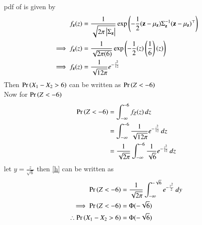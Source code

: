 \documentclass[journal,12pt,twocolumn]{IEEEtran}
\begin{document}
pdf of  is given by
\begin{align}
    f_\mathbf{z}(z)&=\frac{1}{\sqrt{2\pi\begin{vmatrix}\Sigma{_\mathbf{z}}\end{vmatrix}}}\exp{\ensuremath{\left(-\frac{1}{2}(\mathbf{z}-\mu_{\mathbf{z}})\Sigma^{-1}_{\mathbf{z}}(\mathbf{z}-\mu_{\mathbf{z}})^{\top}\right)}}\\
    \implies f_\mathbf{z}(z)&=\frac{1}{\sqrt{2\pi(6)}}\exp{\ensuremath{\left(-\frac{1}{2}(z)\left(\frac{1}{6}\right)(z)\right)}}\\
    \implies f_\mathbf{z}(z)&=\frac{1}{\sqrt{12\pi}}e^{-\frac{{z}^2}{12}}
\end{align}
Then $\Pr\left(X_1-X_2>6\right)$ can be written as $\Pr\left(Z<-6\right)$\\

Now for $\Pr\left(Z<-6\right)$
\begin{align}
    \Pr\left(Z<-6\right)&=\int_{-\infty}^{-6}f_Z(z)\,dz\\
             &=\int_{-\infty}^{-6}\frac{1}{ \sqrt{12\pi}}e^{-\frac{{z}^2}{12}}\,dz\\
             &=\frac{1}{ \sqrt{2\pi}}\int_{-\infty}^{-6}\frac{1}{ \sqrt{6}}e^{-\frac{{z}^2}{12}}\,dz
             \label{h}
\end{align}
let $y=\frac{z}{\sqrt{6}}$ then \eqref{h} can be written as
\begin{align}
    \Pr\left(Z<-6\right)&=\frac{1}{ \sqrt{2\pi}}\int_{-\infty}^{-\sqrt{6}}e^{-\frac{{y}^2}{2}}\,dy\\
    \implies \Pr\left(Z<-6\right)&=\Phi(-\sqrt{6})\\
    \therefore \Pr\left(X_1-X_2>6\right)&=\Phi(-\sqrt{6})
\end{align}
\end{document}
